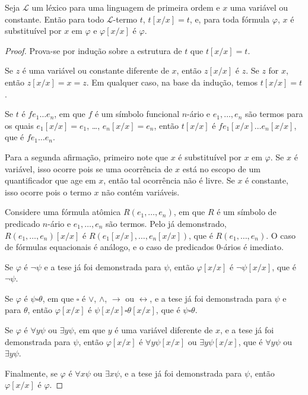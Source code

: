 \begin{metalemma}
    Seja $\mathcal L$ um léxico para uma linguagem de primeira ordem e $x$ uma variável ou constante.
    Então para todo $\mathcal L$-termo $t$, $t[x/x]=t$, e, para toda fórmula $\varphi$, $x$ é substituível por $x$ em $\varphi$ e $\varphi[x/x]$ é $\varphi$.
\end{metalemma}
\begin{proof}
    Prova-se por indução sobre a estrutura de $t$ que $t[x/x]=t$.

    Se $z$ é uma variável ou constante diferente de $x$, então $z[x/x]$ é $z$.
    Se $z$ for $x$, então $z[x/x]=x=z$.
    Em qualquer caso, na base da indução, temos $t[x/x]=t$.

    Se $t$ é $fe_1 \dots e_n$, em que $f$ é um símbolo funcional $n$-ário e $e_1, \dots, e_n$ são termos para os quais $e_1[x/x]=e_1$, \dots, $e_n[x/x]=e_n$, então $t[x/x]$ é $fe_1[x/x] \dots e_n[x/x]$, que é $fe_1 \dots e_n$.

    Para a segunda afirmação, primeiro note que $x$ é substituível por $x$ em $\varphi$.
    Se $x$ é variável, isso ocorre pois se uma ocorrência de $x$ está no escopo de um quantificador que age em $x$, então tal ocorrência não é livre.
    Se $x$ é constante, isso ocorre pois o termo $x$ não contém variáveis.
    
    Considere uma fórmula atômica $R(e_1, \dots, e_n)$, em que $R$ é um símbolo de predicado $n$-ário e $e_1, \dots, e_n$ são termos.
    Pelo já demonstrado, $R(e_1, \dots, e_n)[x/x]$ é $R(e_1[x/x], \dots, e_n[x/x])$, que é $R(e_1, \dots, e_n)$.
    O caso de fórmulas equacionais é análogo, e o caso de predicados $0$-ários é imediato.

    Se $\varphi$ é $\neg \psi$ e a tese já foi demonstrada para $\psi$, então $\varphi[x/x]$ é $\neg \psi[x/x]$, que é $\neg \psi$.

    Se $\varphi$ é $\psi \square \theta$, em que $\square$ é $\vee$, $\wedge$, $\rightarrow$ ou $\leftrightarrow$, e a tese já foi demonstrada para $\psi$ e para $\theta$, então $\varphi[x/x]$ é $\psi[x/x] \square \theta[x/x]$, que é $\psi \square \theta$.

    Se $\varphi$ é $\forall y \psi$ ou $\exists y \psi$, em que $y$ é uma variável diferente de $x$, e a tese já foi demonstrada para $\psi$, então $\varphi[x/x]$ é $\forall y \psi[x/x]$ ou $\exists y \psi[x/x]$, que é $\forall y \psi$ ou $\exists y \psi$.

    Finalmente, se $\varphi$ é $\forall x \psi$ ou $\exists x \psi$, e a tese já foi demonstrada para $\psi$, então $\varphi[x/x]$ é $\varphi$.
\end{proof}

